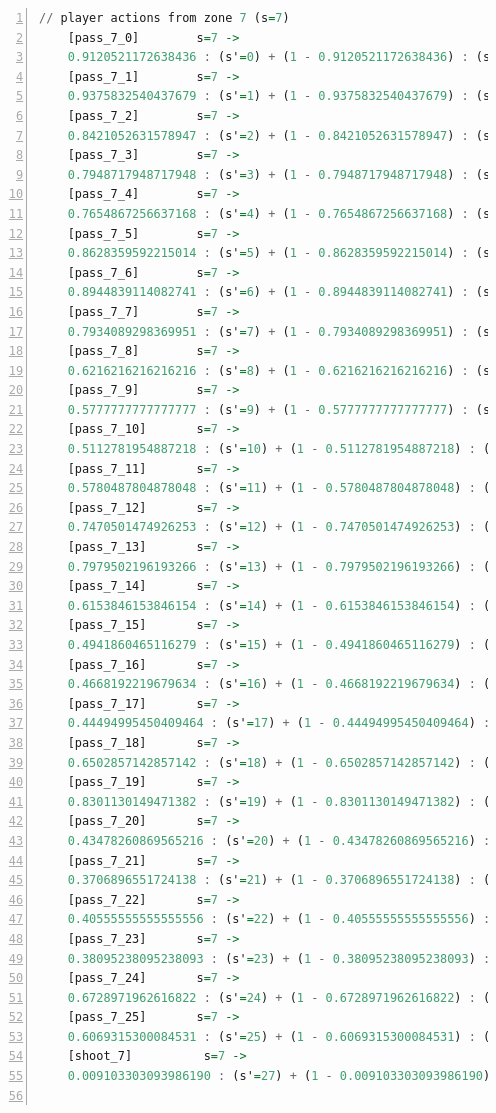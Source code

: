 \documentclass{l4proj}
\begin{document}
\begin{appendices}
\begin{lstlisting}[language=Haskell, numbers=left, caption=MDP used for strategy generation. This is the model specification as-is after the refinements at the end of chapter 3.]
	// player actions from zone 7 (s=7)
	[pass_7_0]	      s=7 ->
	0.9120521172638436 : (s'=0) + (1 - 0.9120521172638436) : (s'=26);
	[pass_7_1]	      s=7 ->
	0.9375832540437679 : (s'=1) + (1 - 0.9375832540437679) : (s'=26);
	[pass_7_2]	      s=7 ->
	0.8421052631578947 : (s'=2) + (1 - 0.8421052631578947) : (s'=26);
	[pass_7_3]	      s=7 ->
	0.7948717948717948 : (s'=3) + (1 - 0.7948717948717948) : (s'=26);
	[pass_7_4]	      s=7 ->
	0.7654867256637168 : (s'=4) + (1 - 0.7654867256637168) : (s'=26);
	[pass_7_5]	      s=7 ->
	0.8628359592215014 : (s'=5) + (1 - 0.8628359592215014) : (s'=26);
	[pass_7_6]	      s=7 ->
	0.8944839114082741 : (s'=6) + (1 - 0.8944839114082741) : (s'=26);
	[pass_7_7]	      s=7 ->
	0.7934089298369951 : (s'=7) + (1 - 0.7934089298369951) : (s'=26);
	[pass_7_8]	      s=7 ->
	0.6216216216216216 : (s'=8) + (1 - 0.6216216216216216) : (s'=26);
	[pass_7_9]	      s=7 ->
	0.5777777777777777 : (s'=9) + (1 - 0.5777777777777777) : (s'=26);
	[pass_7_10]	      s=7 ->
	0.5112781954887218 : (s'=10) + (1 - 0.5112781954887218) : (s'=26);
	[pass_7_11]	      s=7 ->
	0.5780487804878048 : (s'=11) + (1 - 0.5780487804878048) : (s'=26);
	[pass_7_12]	      s=7 ->
	0.7470501474926253 : (s'=12) + (1 - 0.7470501474926253) : (s'=26);
	[pass_7_13]	      s=7 ->
	0.7979502196193266 : (s'=13) + (1 - 0.7979502196193266) : (s'=26);
	[pass_7_14]	      s=7 ->
	0.6153846153846154 : (s'=14) + (1 - 0.6153846153846154) : (s'=26);
	[pass_7_15]	      s=7 ->
	0.4941860465116279 : (s'=15) + (1 - 0.4941860465116279) : (s'=26);
	[pass_7_16]	      s=7 ->
	0.4668192219679634 : (s'=16) + (1 - 0.4668192219679634) : (s'=26);
	[pass_7_17]	      s=7 ->
	0.44494995450409464 : (s'=17) + (1 - 0.44494995450409464) : (s'=26);
	[pass_7_18]	      s=7 ->
	0.6502857142857142 : (s'=18) + (1 - 0.6502857142857142) : (s'=26);
	[pass_7_19]	      s=7 ->
	0.8301130149471382 : (s'=19) + (1 - 0.8301130149471382) : (s'=26);
	[pass_7_20]	      s=7 ->
	0.43478260869565216 : (s'=20) + (1 - 0.43478260869565216) : (s'=26);
	[pass_7_21]	      s=7 ->
	0.3706896551724138 : (s'=21) + (1 - 0.3706896551724138) : (s'=26);
	[pass_7_22]	      s=7 ->
	0.40555555555555556 : (s'=22) + (1 - 0.40555555555555556) : (s'=26);
	[pass_7_23]	      s=7 ->
	0.38095238095238093 : (s'=23) + (1 - 0.38095238095238093) : (s'=26);
	[pass_7_24]	      s=7 ->
	0.6728971962616822 : (s'=24) + (1 - 0.6728971962616822) : (s'=26);
	[pass_7_25]	      s=7 ->
	0.6069315300084531 : (s'=25) + (1 - 0.6069315300084531) : (s'=26);
	[shoot_7]	       s=7 ->
	0.009103303093986190 : (s'=27) + (1 - 0.009103303093986190) : (s'=26);


\end{lstlisting}
\end{appendices}
\end{document}
